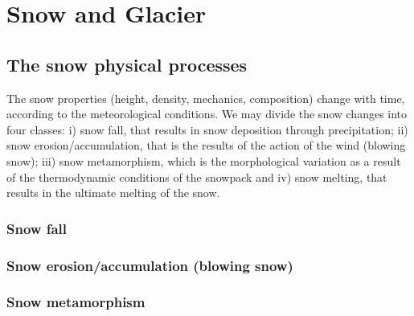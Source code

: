 \chapter{Snow and Glacier}

\section{The snow physical processes}

The snow properties (height, density, mechanics, composition) change with time, according to the meteorological conditions. We may divide the snow changes into four classes: i) snow fall, that results in snow deposition through precipitation; ii) snow erosion/accumulation, that is the results of the action of the wind (blowing snow); iii) snow metamorphism, which is the morphological variation as a result of the thermodynamic conditions of the snowpack and iv) snow melting, that results in the ultimate melting of the snow.


\subsection{Snow fall}

\subsection{Snow erosion/accumulation (blowing snow)}

\subsection{Snow metamorphism}\label{met}



